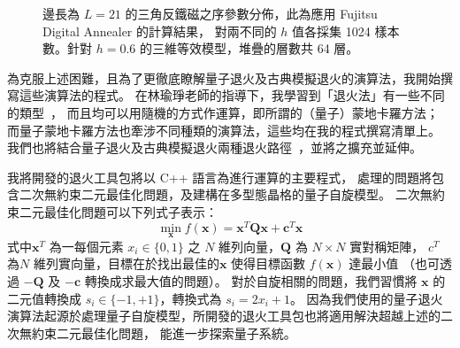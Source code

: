 \documentclass[12pt]{article}
\newcommand{\abs}[1]{\lvert#1\rvert}
\newcommand{\be}{\begin{equation}}
\newcommand{\ee}{\end{equation}}
\begin{document}
\begin{figure}[htp!]
{\par\centering {} \par}
\caption{
 \label{fig:m}
邊長為 $L=21$ 的三角反鐵磁之序參數分佈，此為應用 Fujitsu Digital Annealer 的計算結果，
對兩不同的 $h$ 值各採集 1024 樣本數。針對 $h=0.6$ 的三維等效模型，堆疊的層數共 64 層。
 }
\end{figure}

為克服上述困難，且為了更徹底瞭解量子退火及古典模擬退火的演算法，我開始撰寫這些演算法的程式。
在林瑜琤老師的指導下，我學習到「退火法」有一些不同的類型~\cite{Sandvik_Nat,Huang}，
而且均可以用隨機的方式作運算，即所謂的（量子）蒙地卡羅方法；
而量子蒙地卡羅方法也牽涉不同種類的演算法，這些均在我的程式撰寫清單上。
我們也將結合量子退火及古典模擬退火兩種退火路徑~\cite{He}，並將之擴充並延伸。

我將開發的退火工具包將以 C++ 語言為進行運算的主要程式，
處理的問題將包含二次無約束二元最佳化問題，及建構在多型態晶格的量子自旋模型。
二次無約束二元最佳化問題可以下列式子表示：
\be
       \min_{\bm{x}}  f(\bm{x}) = \bm{x}^T \bm{Q} \bm{x} + \bm{c}^T \bm{x}  
       \label{eq:qubo}
\ee
式中$\bm{x}^T$ 為一每個元素 $x_i\in \{0,1\}$ 之 $N$ 維列向量，$\bm{Q}$ 為 $N\times N$ 實對稱矩陣，
$c^T$ 為$N$ 維列實向量，目標在於找出最佳的$\bm{x}$ 使得目標函數 $f(\bm{x})$ 達最小值
（也可透過 $-\bm{Q}$ 及 $-\bm{c}$ 轉換成求最大值的問題）。
對於自旋相關的問題，我們習慣將 $\bm{x}$ 的二元值轉換成 $s_i \in  \{-1,+1\}$，轉換式為 $s_i = 2 x_i +1$。
因為我們使用的量子退火演算法起源於處理量子自旋模型，所開發的退火工具包也將適用解決超越上述的二次無約束二元最佳化問題，
能進一步探索量子系統。     
\end{document}
